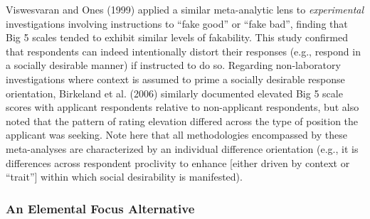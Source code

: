\documentclass[
  english,
  ,jou]{apa6}
\begin{document}
Viswesvaran and Ones (1999) applied a similar meta-analytic lens to \emph{experimental} investigations involving instructions to \enquote{fake good} or \enquote{fake bad}, finding that Big 5 scales tended to exhibit similar levels of fakability. This study confirmed that respondents can indeed intentionally distort their responses (e.g., respond in a socially desirable manner) if instructed to do so. Regarding non-laboratory investigations where context is assumed to prime a socially desirable response orientation, Birkeland et al. (2006) similarly documented elevated Big 5 scale scores with applicant respondents relative to non-applicant respondents, but also noted that the pattern of rating elevation differed across the type of position the applicant was seeking. Note here that all methodologies encompassed by these meta-analyses are characterized by an individual difference orientation (e.g., it is differences across respondent proclivity to enhance {[}either driven by context or \enquote{trait}{]} within which social desirability is manifested).

\hypertarget{an-elemental-focus-alternative}{%
\subsubsection{An Elemental Focus Alternative}\label{an-elemental-focus-alternative}}
\end{document}
